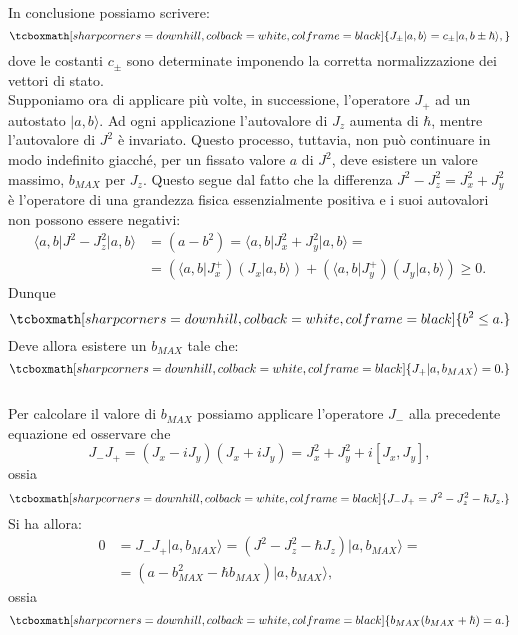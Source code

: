 \documentclass[a4paper,12pt,oneside]{book}
\begin{document}
In conclusione possiamo scrivere:
	\begin{equation}
		\tcboxmath[sharp corners=downhill, colback=white, colframe=black]{
			J_{\pm} \vert a, b \rangle = c_{\pm}\vert a, b\pm \hbar \rangle,
			}
	\label{eq:cap16_5}
	\end{equation}
dove le costanti $c_{\pm}$ sono determinate imponendo la corretta normalizzazione dei vettori di stato.\\

Supponiamo ora di applicare più volte, in successione, l'operatore $J_+$ ad un autostato $\vert a,b \rangle $. Ad ogni applicazione l'autovalore di $J_z$ aumenta di $\hbar$, mentre l'autovalore di $J^2$ è invariato. Questo processo, tuttavia, non può continuare in modo indefinito giacché, per un fissato valore $a$ di $J^2$, deve esistere un valore massimo, $b_{MAX}$ per $J_z$. Questo segue dal fatto che la differenza $J^2-J_z ^2=J_x ^2+J_y ^2$ è l'operatore di una grandezza fisica essenzialmente positiva e i suoi autovalori non possono essere negativi:
	\begin{align}
		\langle a,b \vert J^2-J_z ^2 \vert a, b \rangle &= (a-b^2) =  \langle a,b \vert J_x ^2+J_y ^2 \vert a, b \rangle = \nonumber \\
		&=\left(\langle a,b \vert J_x ^+\right) \left(J_x \vert a, b \rangle\right)+\left(\langle a,b \vert J_y ^+\right) \left(J_y \vert a, b \rangle\right) \geq 0.
	\end{align}
Dunque
	\begin{equation}
		\tcboxmath[sharp corners=downhill, colback=white, colframe=black]{
			b^2 \leq a .
			}
	\label{eq:cap16_6}
	\end{equation}
Deve allora esistere un $b_{MAX}$ tale che:
	\begin{equation}
		\tcboxmath[sharp corners=downhill, colback=white, colframe=black]{
			J_{+} \vert a, b_{MAX} \rangle =0.
			}
	\end{equation}\\
	
Per calcolare il valore di $b_{MAX}$ possiamo applicare l'operatore $J_-$ alla precedente equazione ed osservare che 
	\begin{equation}
		J_-J_+ = (J_x-iJ_y)(J_x+iJ_y)= J_x^2 +J_y ^2+i[J_x, J_y] ,
	\end{equation}
ossia 
	\begin{equation}
		\tcboxmath[sharp corners=downhill, colback=white, colframe=black]{
			J_-J_+ = J^2 -J_z ^2 -\hbar J_z .
			}
	\label{eq:cap16_7}
	\end{equation}
Si ha allora:
	\begin{align}
		0&=J_{-}J_{+} \vert a, b_{MAX} \rangle = (J^2 -J_z ^2 -\hbar J_z)\vert a, b_{MAX} \rangle = \nonumber \\
		&=(a- b_{MAX} ^2 - \hbar b_{MAX} )\vert a, b_{MAX} \rangle,
	\end{align}
ossia
	\begin{equation}
		\tcboxmath[sharp corners=downhill, colback=white, colframe=black]{
			b_{MAX}(b_{MAX}+\hbar) =a .
			}
	\label{eq:cap16_8}
	\end{equation}\\
	
\end{document}
